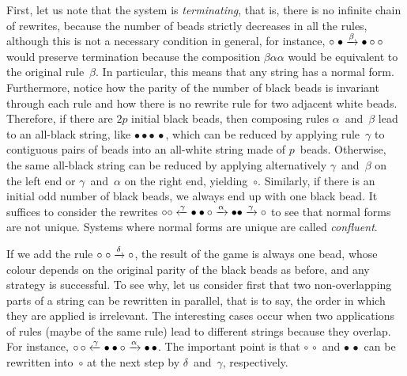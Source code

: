 First, let us note that the system is
\emph{terminating}, that is, there is no infinite
chain of rewrites, because the number of beads strictly decreases in
all the rules, although this is not a necessary condition in general,
for instance, \(\circ \; \bullet \xrightarrow{\smash{\beta}} \bullet
\circ \circ\) would preserve termination because the composition
\(\beta\alpha\alpha\) would be equivalent to the original
rule~\(\beta\). In particular, this means that any string has a normal
form. Furthermore, notice how the parity of the number of black beads
is invariant through each rule and how there is no rewrite rule for
two adjacent white beads. Therefore, if there are \(2p\) initial black
beads, then composing rules \(\alpha\)~and~\(\beta\) lead to an
all\hyp{}black string, like \(\bullet \bullet \bullet \, \bullet\),
which can be reduced by applying rule~\(\gamma\) to contiguous pairs
of beads into an all\hyp{}white string made of \(p\)~beads. Otherwise,
the same all\hyp{}black string can be reduced by applying
alternatively \(\gamma\)~and~\(\beta\) on the left end or
\(\gamma\)~and~\(\alpha\) on the right end,
yielding~\(\circ\). Similarly, if there is an initial odd number of
black beads, we always end up with one black bead. It suffices to
consider the rewrites \(\circ \circ \xleftarrow{\smash{\gamma}}
\bullet \bullet \circ \xrightarrow{\smash{\alpha}} \bullet \bullet
\xrightarrow{\smash{\gamma}} \circ\) to see that normal forms are not
unique. Systems where normal forms are unique are called
\emph{confluent}.

If we add the rule \(\circ\; \circ \xrightarrow{\smash{\delta}}
\circ\), the result of the game is always one bead, whose colour
depends on the original parity of the black beads as before, and any
strategy is successful. To see why, let us consider first that two
non\hyp{}overlapping parts of a string can be rewritten in parallel,
that is to say, the order in which they are applied is irrelevant.
The interesting cases occur when two applications of rules (maybe of
the same rule) lead to different strings because they overlap. For
instance, \(\circ \, \circ \xleftarrow{\smash{\gamma}} \bullet \bullet
\circ \xrightarrow{\smash{\alpha}} \bullet \, \bullet\). The important
point is that \(\circ \, \circ\) and \(\bullet \, \bullet\) can be
rewritten into~\(\circ\) at the next step by
\(\delta\)~and~\(\gamma\), respectively.

